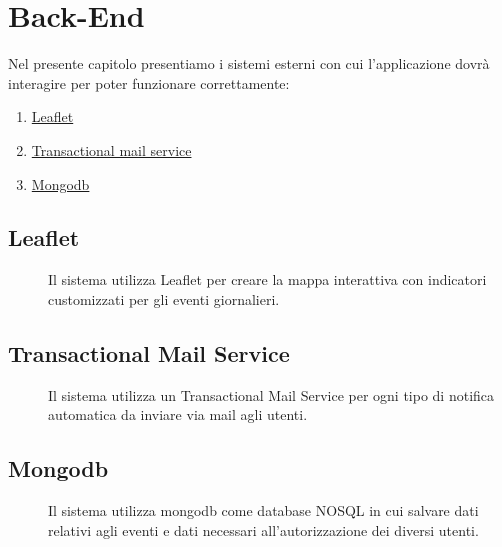 \documentclass{article}
\begin{document}
\section{Back-End}
Nel presente capitolo presentiamo i sistemi esterni con cui l’applicazione dovrà interagire per poter funzionare correttamente:
\begin{enumerate}
    \item \hyperref[leaflet]{Leaflet}
    \item \hyperref[TMS]{Transactional mail service}
    \item \hyperref[mongo]{Mongodb}
\end{enumerate}
\subsection{Leaflet \label{leaflet}}
\begin{description}
    \item[] Il sistema utilizza Leaflet per creare la mappa interattiva con indicatori customizzati per gli eventi giornalieri.
\end{description}
\subsection{Transactional Mail Service \label{TMS}}
\begin{description}
    \item[] Il sistema utilizza un Transactional Mail Service per ogni tipo di notifica automatica da inviare via mail agli utenti.
\end{description}
\subsection{Mongodb \label{mongo}}
\begin{description}
    \item[] Il sistema utilizza mongodb come database NOSQL in cui salvare dati relativi agli eventi e dati necessari all'autorizzazione dei diversi utenti.
\end{description}
\end{document}
